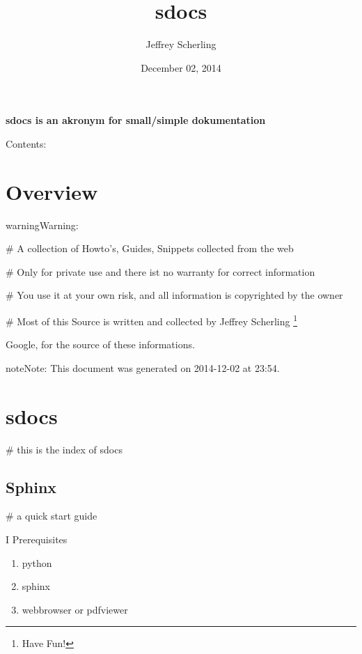 \documentclass[letterpaper,10pt,english]{sphinxmanual}
\title{sdocs}
\date{December 02, 2014}
\author{Jeffrey Scherling}
\begin{document}
\maketitle
\tableofcontents
{}\label{index::doc}


\textbf{sdocs is an akronym for small/simple dokumentation}

Contents:


\chapter{Overview}
\label{sdocs/overview:overview}\label{sdocs/overview:welcome-to-sdocs}\label{sdocs/overview::doc}
\begin{notice}{warning}{Warning:}
\begin{DUlineblock}{0em}
\item[] \# A collection of Howto's, Guides, Snippets collected from the web
\item[] \# Only for private use and there ist no warranty for correct information
\item[] \# You use it at your own risk, and all information is copyrighted by the owner
\item[] \# Most of this Source is written and collected by Jeffrey Scherling \footnote{
Have Fun!
}
\end{DUlineblock}
\end{notice}




Google, for the source of these informations.



\begin{notice}{note}{Note:}
This document was generated on 2014-12-02 at 23:54.
\end{notice}


\chapter{sdocs}
\label{sdocs/index_sdocs::doc}\label{sdocs/index_sdocs:sdocs}
\# this is the index of sdocs


\section{Sphinx}
\label{sdocs/sphinx/sphinx:sphinx}\label{sdocs/sphinx/sphinx::doc}
\# a quick start guide

I Prerequisites
\begin{enumerate}
\item {} 
python

\item {} 
sphinx

\item {} 
webbrowser or pdfviewer

\end{enumerate}
\end{document}
